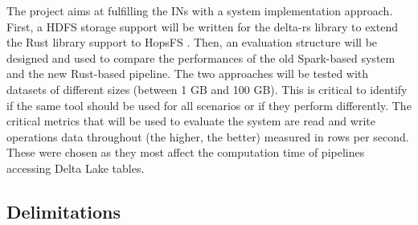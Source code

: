 The project aims at fulfilling the \glspl{IN} with a system implementation approach. First, a \gls{HDFS} storage support will be written for the delta-rs library to extend the Rust library support to \gls{HopsFS} \cite{niaziHopsFSScalingHierarchical2017}. Then, an evaluation structure will be designed and used to compare the performances of the old Spark-based system and the new Rust-based pipeline. The two approaches will be tested with datasets of different sizes (between 1 GB and 100 GB). This is critical to identify if the same tool should be used for all scenarios or if they perform differently. The critical metrics that will be used to evaluate the system are read and write operations data throughout (the higher, the better) measured in rows per second. These were chosen as they most affect the computation time of pipelines accessing Delta Lake tables.

\subsection{Delimitations}
    \label{subsec:delimitations}
    